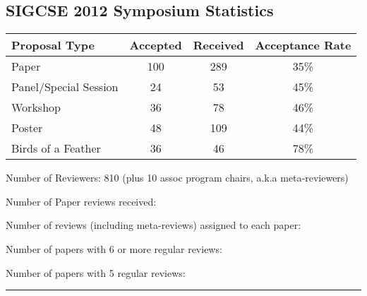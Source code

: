 \begin{center}
	\section*{SIGCSE 2012 Symposium Statistics} 
	\begin{tabular}{|l|c|c|c|}
	\hline
	Proposal Type & Accepted & Received & Acceptance Rate \\ \hline
	Paper & 100 & 289 & 35\% \\ \hline
	Panel/Special Session & 24 & 53 & 45\% \\ \hline
	Workshop & 36 & 78 & 46\% \\ \hline
	Poster & 48 & 109 & 44\% \\ \hline
	Birds of a Feather & 36 & 46 & 78\% \\ \hline
	\end{tabular}
\end{center}

Number of Reviewers:  810 (plus 10 assoc program chairs, a.k.a meta-reviewers)

Number of Paper reviews received:

Number of reviews (including meta-reviews) assigned to each paper:

Number of papers with 6 or more regular reviews:

Number of papers with 5 regular reviews:


\noindent\rule{5in}{0.02cm}

